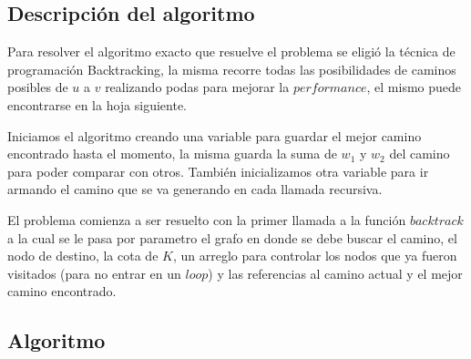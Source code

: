 \subsection{Descripci\'on del algoritmo}

Para resolver el algoritmo exacto que resuelve el problema se eligi\'o la t\'ecnica de programaci\'on Backtracking, la misma recorre todas las posibilidades de caminos posibles de $u$ a $v$ realizando podas para mejorar la $performance$, el mismo puede encontrarse en la hoja siguiente.

Iniciamos el algoritmo creando una variable para guardar el mejor camino encontrado hasta el momento, la misma guarda la suma de $w_{1}$ y $w_{2}$ del camino para poder comparar con otros. Tambi\'en inicializamos otra variable para ir armando el camino que se va generando en cada llamada recursiva.

El problema comienza a ser resuelto con la primer llamada a la funci\'on $backtrack$ a la cual se le pasa por parametro el grafo en donde se debe buscar el camino, el nodo de destino, la cota de $K$, un arreglo para controlar los nodos que ya fueron visitados (para no entrar en un $loop$) y las referencias al camino actual y el mejor camino encontrado.


\newpage
\subsection{Algoritmo}

